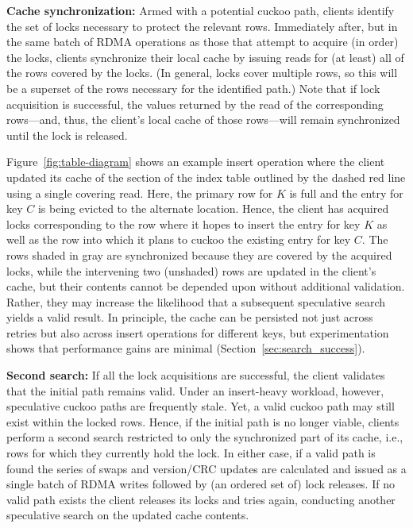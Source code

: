 
\textbf{Cache synchronization:} Armed with a potential cuckoo path,
clients identify the set of locks necessary to protect the relevant
rows.  Immediately after, but in the same batch of RDMA operations as
those that attempt to acquire (in order) the locks, clients
synchronize their local cache by issuing reads for (at least) all of
the rows covered by the locks.  (In general, locks cover multiple
rows, so this will be a superset of the rows necessary for the
identified path.)  Note that if lock acquisition is successful, the
values returned by the read of the corresponding rows---and, thus, the
client's local cache of those rows---will remain synchronized until
the lock is released.

Figure~\ref{fig:table-diagram} shows an example insert operation where
the client updated its cache of the section of the
index table outlined by the dashed red line using a single covering read.
Here, the primary row for $K$ is full and the entry for key $C$ is
being evicted to the alternate location.  Hence, the client has
acquired locks corresponding to the row where it hopes to insert the
entry for key $K$ as well as the row into which it plans to cuckoo the
existing entry for key $C$.  The rows shaded in gray are synchronized
because they are covered by the acquired locks, while the intervening
two (unshaded) rows are updated in the client's cache, but their
contents cannot be depended upon without additional validation.
Rather, they may increase the likelihood that a subsequent speculative
search yields a valid result.
In principle, the cache can be persisted not just across retries but also across
insert operations for different keys, but
experimentation shows that performance gains are minimal
(Section~\ref{sec:search_success}).

\textbf{Second search:} If all the lock acquisitions are successful,
the client validates that the initial path remains valid.  Under an
insert-heavy workload, however, speculative cuckoo paths are
frequently stale.  Yet, a valid cuckoo path may still exist within the
locked rows.  Hence, if the initial path is no longer viable, clients
perform a second search restricted to only the synchronized part of
its cache, i.e., rows for which they currently hold the lock.  In
either case, if a valid path is found the series of swaps and
version/CRC updates are calculated and issued as a single batch of
RDMA writes followed by (an ordered set of) lock releases. If no valid
path exists the client releases its locks and tries again, conducting
another speculative search on the updated cache contents.

